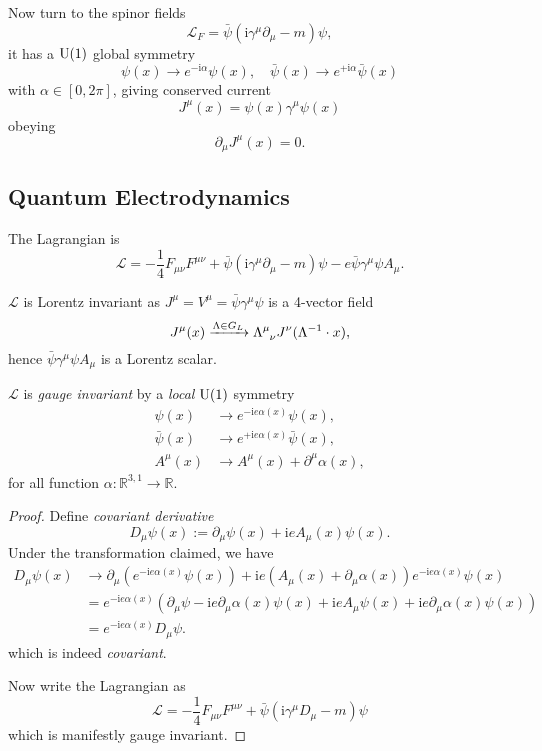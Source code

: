 \documentclass[a4paper,11pt]{article}
\begin{document}
	Now turn to the spinor fields
	\[
		\mathcal{L}_F = \bar \psi(\mathrm{i} \gamma^\mu \partial_\mu - m) \psi,
	\]
	it has a $\operatorname{U}(1)$ global symmetry
	\[
		\psi(x) \to e ^{- \mathrm{i} \alpha} \psi(x), \quad \bar \psi(x) \to e ^{+ \mathrm{i} \alpha} \bar \psi(x)
	\]
	with $\alpha \in [0, 2 \pi]$, giving conserved current
	\[
		J^\mu(x) = \psi(x) \gamma^\mu \psi(x)
	\]
	obeying 
	\[
		\partial_\mu J^\mu(x) = 0.
	\]
	
	\subsection{Quantum Electrodynamics}

	The Lagrangian is
	\[
		\mathcal{L} = - \frac{1}{4} F _{\mu \nu} F ^{\mu \nu} + \bar \psi (\mathrm{i} \gamma^\mu \partial_\mu - m) \psi - e \bar \psi \gamma^\mu \psi A_\mu.
	\]

	$\mathcal{L}$ is Lorentz invariant as $J^\mu = V^\mu = \bar \psi \gamma^\mu \psi$ is a 4-vector field
	\[
		J^\mu (x) \xrightarrow{\Lambda \in G_L} \LT{\mu}{\nu} J^\nu(\Lambda^{-1} \cdot x),
	\]
	hence $\bar \psi \gamma^\mu \psi A_\mu$ is a Lorentz scalar.

	\begin{clm}
		$\mathcal{L}$ is \emph{gauge invariant} by a \emph{local} $\operatorname{U}(1)$ symmetry
		\begin{align*}
			\psi(x) &\to e ^{-\mathrm{i} e \alpha(x)} \psi(x),\\
			\bar \psi(x) &\to e ^{+\mathrm{i} e \alpha(x)} \bar \psi(x),\\
			A^\mu(x) & \to A^\mu(x) + \partial^\mu \alpha(x),
		\end{align*}
		for all function $\alpha: \mathbb{R} ^{3,1} \to \mathbb{R}$.
	\end{clm}
	
	\begin{proof}
		Define \emph{covariant derivative}
		\[
			D_\mu \psi(x) := \partial_\mu \psi(x) + \mathrm{i} e A_\mu(x) \psi(x).
		\]
		Under the transformation claimed, we have
		\begin{align*}
			D_\mu \psi(x) &\to \partial_\mu \left( e ^{- \mathrm{i} e \alpha(x)} \psi(x) \right) + \mathrm{i} e \left( A_\mu(x) + \partial_\mu \alpha(x) \right) e ^{-\mathrm{i} e \alpha(x)} \psi(x)\\
			& = e ^{-\mathrm{i} e \alpha(x)}\left( \partial_\mu \psi - \mathrm{i} e \partial_\mu \alpha(x) \psi(x) + \mathrm{i} e A_\mu \psi(x) + \mathrm{i} e \partial_\mu \alpha(x)\psi(x) \right)\\
			& = e ^{-\mathrm{i} e \alpha(x)} D_\mu \psi.
		\end{align*}
		which is indeed \emph{covariant}.

		Now write the Lagrangian as 
		\[
			\mathcal{L} = - \frac{1}{4} F _{\mu \nu} F ^{\mu \nu} + \bar \psi(\mathrm{i} \gamma^\mu D_\mu - m)\psi
		\]
		which is manifestly gauge invariant.
	\end{proof}
\end{document}
